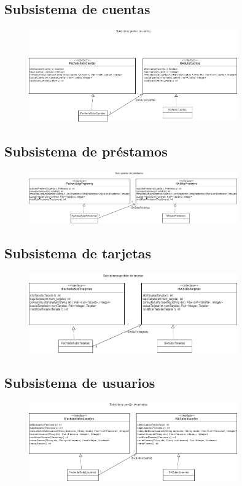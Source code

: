 \documentclass[12pt]{article}
\begin{document}
\subsection{Subsistema de cuentas}
\begin{figure}[H]
    \centering
    \includegraphics[width=0.8\textwidth]{images/SubsCuentas.png}
\end{figure}
\subsection{Subsistema de préstamos}
\begin{figure}[H]
    \centering
    \includegraphics[width=0.8\textwidth]{images/SubsPrestamos.png}
\end{figure}
\subsection{Subsistema de tarjetas}
\begin{figure}[H]
    \centering
    \includegraphics[width=0.8\textwidth]{images/SubsTarjeta.png}
\end{figure}
\subsection{Subsistema de usuarios}
\begin{figure}[H]
    \centering
    \includegraphics[width=0.8\textwidth]{images/SubsUsuarios.png}
\end{figure}
\end{document}
